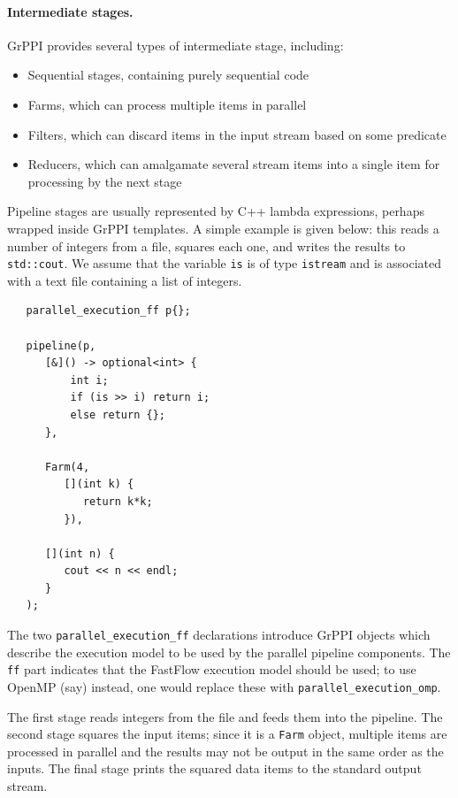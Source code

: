 \paragraph{Intermediate stages.} GrPPI provides several types of intermediate stage, including:
\begin{itemize}
\item Sequential stages, containing purely sequential code
\item Farms, which can process multiple items in parallel
\item Filters, which can discard items in the input stream based on some predicate
\item Reducers, which can amalgamate several stream items into a single item for processing by the next stage
\end{itemize}

Pipeline stages are usually represented by C++ lambda expressions,
perhaps wrapped inside GrPPI templates.  A simple example is given
below: this reads a number of integers from a file, squares each one,
and writes the results to \verb|std::cout|. We assume that the
variable \verb|is| is of type \verb|istream| and is associated
with a text file containing a list of integers.

{\scriptsize
\begin{lstlisting}
   parallel_execution_ff p{};

   pipeline(p,
      [&]() -> optional<int> {
          int i;
          if (is >> i) return i;
          else return {};
      },

      Farm(4,
         [](int k) {
            return k*k;
         }),

      [](int n) {
         cout << n << endl;
      }
   );
\end{lstlisting}
}

The two \verb|parallel_execution_ff| declarations introduce GrPPI
objects which describe the execution model to be used by 
the parallel pipeline components.  The \verb|ff| part indicates that
the FastFlow execution model should be used; to use OpenMP (say)
instead, one would replace these with \verb|parallel_execution_omp|.

The first stage reads integers from the file and feeds them into the pipeline.
The second stage squares the input items; since it is a \verb|Farm| object,
multiple items are processed in parallel and the results may not be output
in the same order as the inputs.
The final stage prints the squared data items to the standard output stream.


